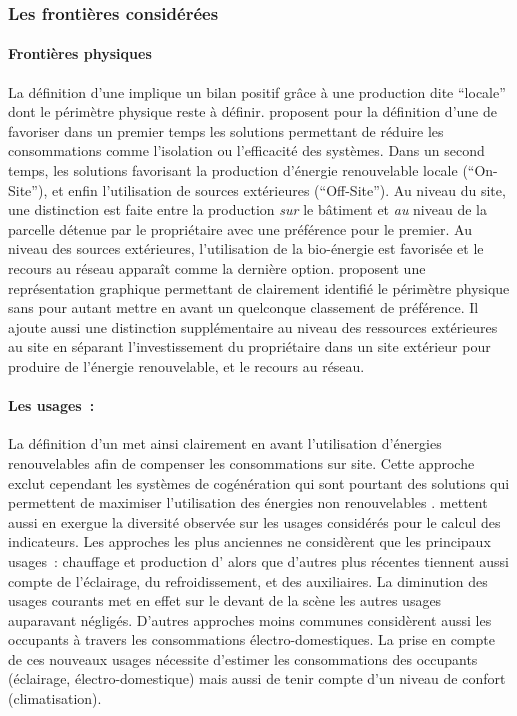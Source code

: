 \subsubsection{Les frontières considérées} %
\label{ssub:les_frontieres_considerees}
\paragraph{Frontières physiques} %
\label{par:frontières_physiques}
La définition d’une  implique un bilan positif grâce à une production dite
\enquote{locale} dont le périmètre physique reste à définir.
\textcite{Torcellini2006} proposent pour la définition d’une 
de favoriser dans un premier temps les solutions permettant de réduire les consommations
comme l’isolation ou l’efficacité des systèmes. Dans un second temps, les solutions favorisant
la production d’énergie renouvelable locale (\enquote{On-Site}), et enfin
l’utilisation de sources extérieures (\enquote{Off-Site}). Au niveau du site, une
distinction est faite entre la production \emph{sur} le bâtiment et \emph{au} niveau de la
parcelle détenue par le propriétaire avec une préférence pour le premier.
Au niveau des sources extérieures, l’utilisation de la bio-énergie est favorisée et
le recours au réseau apparaît comme la dernière option.
\textcite{Marszal2010} proposent une représentation graphique permettant de clairement
identifié le périmètre physique sans pour autant mettre en avant un quelconque
classement de préférence. Il ajoute aussi une distinction supplémentaire au niveau
des ressources extérieures au site en séparant l’investissement du propriétaire dans
un site extérieur pour produire de l’énergie renouvelable, et le recours au réseau.

\paragraph{Les usages~:} %
\label{par:les_usages}
La définition d’un  met ainsi clairement en avant l’utilisation d’énergies
renouvelables afin de compenser les consommations sur site. Cette approche exclut
cependant les systèmes de cogénération qui sont pourtant des solutions qui permettent
de maximiser l’utilisation des énergies non renouvelables \parencite{Sartori2010}.
\textcite{Marszal2011971} mettent aussi en exergue la diversité observée sur les usages considérés pour le calcul
des indicateurs. Les approches les plus anciennes ne considèrent que les principaux usages~: chauffage
et production d’ alors que d’autres plus récentes tiennent aussi compte de l’éclairage,
du refroidissement, et des auxiliaires. La diminution des usages courants met en effet
sur le devant de la scène les autres usages auparavant négligés. D’autres approches
moins communes considèrent aussi les occupants à travers les consommations électro-domestiques.
La prise en compte de ces nouveaux usages nécessite d’estimer les consommations des occupants
(éclairage, électro-domestique) mais aussi de tenir compte d’un niveau de confort (climatisation).


